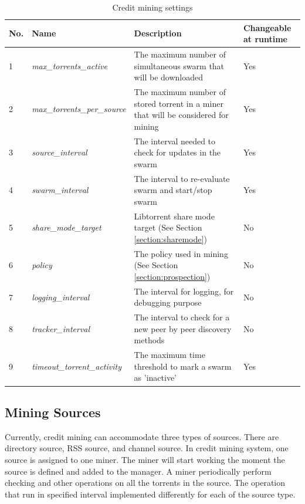 \begin{table}[]
	\centering
	\caption{Credit mining settings}
	\label{tbl:cmsettings}
	\begin{adjustwidth}{-1.5cm}{}
	\begin{tabular}{|p{1cm}|p{4cm}|p{7cm}|p{2cm}|}
		\hline
		\rowcolor[HTML]{EFEFEF} 
		No. & Name & Description & Changeable at runtime \\ \hline
	1 & \textit{max\_torrents\_active} & The maximum number of simultaneous swarm that will be downloaded & Yes \\ \hline
	2 & \textit{max\_torrents\_per\_source} & The maximum number of stored torrent in a miner that will be considered for mining & Yes \\ \hline
	3 & \textit{source\_interval} & The interval needed to check for updates in the swarm & Yes \\ \hline
	4 & \textit{swarm\_interval} & The interval to re-evaluate swarm and start/stop swarm & Yes \\ \hline
	5 & \textit{share\_mode\_target} & Libtorrent share mode target (See Section \ref{section:sharemode}) & No \\ \hline
	6 & \textit{policy} & The policy used in mining (See Section \ref{section:prospection}) & No \\ \hline
	7 & \textit{logging\_interval} & The interval for logging, for debugging purpose & No \\ \hline
	8 & \textit{tracker\_interval} & The interval to check for a new peer by peer discovery methods & No \\ \hline
	9 & \textit{timeout\_torrent\_activity} & The maximum time threshold to mark a swarm as 'inactive' & Yes \\ \hline
	\end{tabular}
	\end{adjustwidth}
\end{table}

\subsection{Mining Sources}
\label{section:msource} 
Currently, credit mining can accommodate three types of sources. There are directory source, RSS source, and channel source. In credit mining system, one source is assigned to one miner. The miner will start working the moment the source is defined and added to the manager. A miner periodically perform checking and other operations on all the torrents in the source. The operation that run in specified interval implemented differently for each of the source type. 

